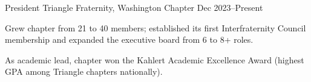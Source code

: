
\roleentry%
  {President}%
  {Triangle Fraternity, Washington Chapter}%
  {Dec 2023--Present}%
  {}%
  {%
    \item Grew chapter from 21 to 40 members; established its first Interfraternity Council membership and expanded the executive board from 6 to 8+ roles.
    \item As academic lead, chapter won the Kahlert Academic Excellence Award (highest GPA among Triangle chapters nationally).
  }

